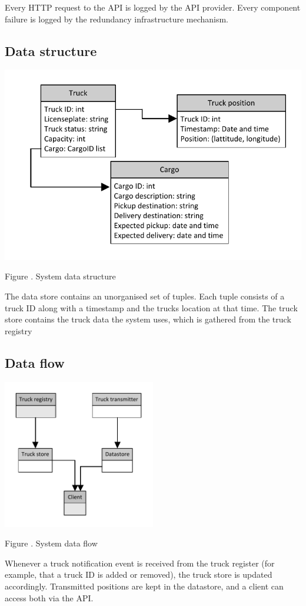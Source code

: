 \documentclass[a4paper,11pt]{report}
\newcommand{\mycaption}[1]{
  \addtocounter{figures}{1}
  Figure \arabic{figures}. #1
}
\begin{document}
Every HTTP request to the API is logged by the API provider.  Every
component failure is logged by the redundancy infrastructure
mechanism.

\subsection{Data structure}
\label{sec:data-structure}

\begin{center}
  \includegraphics[width=\textwidth]{figures/Data_structure}\\
  \mycaption{System data structure}
\end{center}


The data store contains an unorganised set of tuples.  Each tuple
consists of a truck ID along with a timestamp and the trucks location
at that time. The truck store contains the truck data the system uses, which is gathered from the truck registry

\subsection{Data flow}
\label{sec:data-flow}

\begin{center}
  \includegraphics[width=0.5\textwidth]{figures/Data_flow}\\
  \mycaption{System data flow}
\end{center}
Whenever a truck notification event is received from the truck
register (for example, that a truck ID is added or removed), the truck
store is updated accordingly.  Transmitted positions are kept in the
datastore, and a client can access both via the API.
\end{document}
